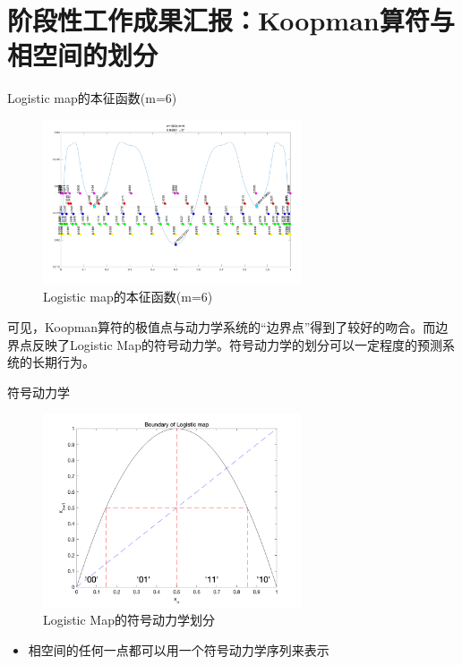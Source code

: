 \documentclass{beamer}
\begin{document}
\section{阶段性工作成果汇报：Koopman算符与相空间的划分}
\begin{frame}{Logistic map的本征函数(m=6)}
\begin{figure}
	\centering
	\includegraphics[width=3in]{figure/logistic_eigen_m6}
	\caption{Logistic map的本征函数(m=6)}
\end{figure}
可见，Koopman算符的极值点与动力学系统的“边界点”得到了较好的吻合。而边界点反映了Logistic Map的符号动力学。符号动力学的划分可以一定程度的预测系统的长期行为。
\end{frame}

\begin{frame}{符号动力学}
\begin{figure}
	\centering
	\includegraphics[width=3in]{figure/logistic_symbolic}
	\caption{Logistic Map的符号动力学划分}
\end{figure}
\begin{itemize}
	\item 相空间的任何一点都可以用一个符号动力学序列来表示
\end{itemize}
\end{frame}
\end{document}
